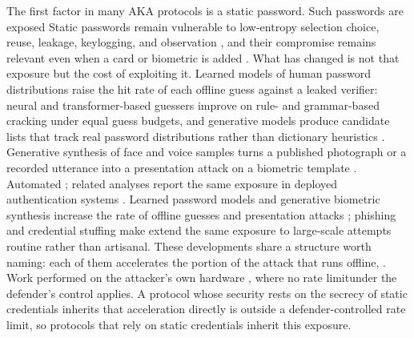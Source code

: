 \documentclass[cmc,article,submit,moreauthors,pdftex]{Definitions/tsp}
\providecommand{\DIFadd}[1]{{\protect\color{blue} \sf #1}} %
\providecommand{\DIFdel}[1]{{\protect\color{red} \scriptsize #1}} %
\providecommand{\DIFaddbegin}{} %
\providecommand{\DIFaddend}{} %
\providecommand{\DIFdelbegin}{} %
\providecommand{\DIFdelend}{} %
\begin{document}
\DIFdelbegin \DIFdel{The first factor in many AKA protocols is a static password. Such passwords are exposed }\DIFdelend \DIFaddbegin \DIFadd{Static passwords remain vulnerable }\DIFaddend to low-entropy \DIFdelbegin \DIFdel{selection}\DIFdelend \DIFaddbegin \DIFadd{choice}\DIFaddend , reuse, leakage, keylogging, and observation \DIFdelbegin \DIFdel{, and their compromise remains relevant }\DIFdelend even when a card or biometric is added \DIFdelbegin \DIFdel{\cite{basharzad,liu2019robust,shakirov,khalid}. What has changed is not that exposure but the cost of exploiting it. Learned models of human password distributions raise the hit rate of each offline guess against a leaked verifier: neural and transformer-based guessers improve on rule- and grammar-based cracking under equal guess budgets, and generative models produce candidate lists that track real password distributions rather than dictionary heuristics \cite{hitaj2019passgan,xu2023passbert}. Generative synthesis of face and voice samples turns a published photograph or a recorded utterance into a presentation attack on a biometric template \cite{tolosana2020deepfakes}. Automated }\DIFdelend \DIFaddbegin \DIFadd{\cite{basharzad,liu2019robust,shakirov}; related analyses report the same exposure in deployed authentication systems \cite{khalid}. Learned password models and generative biometric synthesis increase the rate of offline guesses and presentation attacks \cite{hitaj2019passgan,xu2023passbert,tolosana2020deepfakes}; }\DIFaddend phishing and credential stuffing \DIFdelbegin \DIFdel{make }\DIFdelend \DIFaddbegin \DIFadd{extend the same exposure to }\DIFaddend large-scale attempts\DIFdelbegin \DIFdel{routine rather than artisanal. These developments share a structure worth naming: each of them accelerates the portion of the attack that runs offline, }\DIFdelend \DIFaddbegin \DIFadd{. Work performed }\DIFaddend on the attacker's own hardware \DIFdelbegin \DIFdel{, where no rate limitunder the defender's control applies. A protocol whose security rests on the secrecy of static credentials inherits that acceleration directly}\DIFdelend \DIFaddbegin \DIFadd{is outside a defender-controlled rate limit, so protocols that rely on static credentials inherit this exposure}\DIFaddend .
\end{document}
